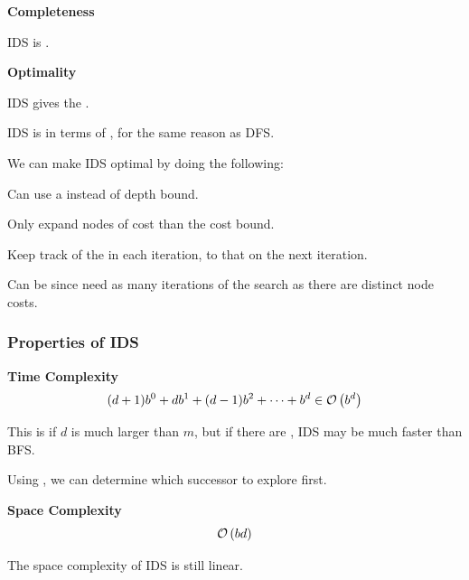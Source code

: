 \begin{listu}
    \item \textbf{Completeness}

    \begin{listu}
        \item IDS is .
    \end{listu}

    \item \textbf{Optimality}

    \begin{listu}
        \item IDS gives the .

        \item IDS is  in terms of , for the same reason as DFS.

        We can make IDS optimal by doing the following:

        \begin{listu}
            \item Can use a  instead of depth bound.
            \item Only expand nodes of cost  than the cost bound.
            \item Keep track of the  in each iteration,  to that on the next iteration.
            \item Can be  since need as many iterations of the search as there are distinct node costs.
        \end{listu}
    \end{listu}
\end{listu}

\subsubsection{Properties of IDS}

\begin{listu}
    \item \textbf{Time Complexity} \[
        (d+1)b^0 + db^1 + (d-1)b^2 + \cdots + b^d \in \mathcal{O}\left(b^d\right)
    \]

    \begin{listu}
        \item This is  if $d$ is much larger than $m$, but if there are , IDS may be much faster than BFS.
        \item Using , we can determine which successor to explore first.
    \end{listu}

    \item \textbf{Space Complexity} \[
        \mathcal{O}\left(bd\right)
    \]

    The space complexity of IDS is still linear.
\end{listu}

